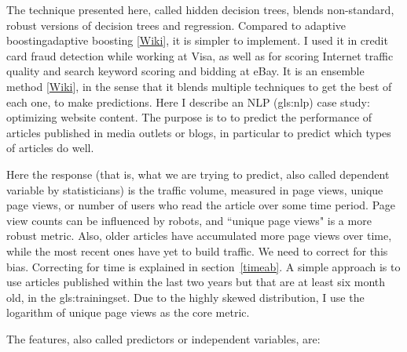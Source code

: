 \documentclass[oneside,10pt]{book}
\renewcommand{\arraystretch}{1.4} %
\begin{document}
The technique presented here, called \textcolor{index}{hidden decision trees}, blends non-standard, robust versions of 
 \textcolor{index}{decision trees} and regression. Compared to \textcolor{index}{adaptive boosting}\textcolor{index}{adaptive boosting} [\href{https://en.wikipedia.org/wiki/AdaBoost}{Wiki}], it is simpler to implement. I used it in credit card fraud detection while working at Visa, as well as for scoring Internet traffic quality and search keyword scoring and bidding at eBay. It is an \textcolor{index}{ensemble method} [\href{https://en.wikipedia.org/wiki/Ensemble_learning}{Wiki}], in the sense that it 
blends multiple techniques to get the best of each one, to make predictions.  Here I describe an NLP (\gls{gls:nlp}) case study: optimizing website content. 
The purpose is to to predict the performance of articles published in media outlets or blogs, in particular to predict which types of articles do well.


Here the response (that is, what we are trying to predict, also called dependent variable by statisticians) is the traffic volume, measured in page views, unique page views, or number of users who read the article over some time period. Page view counts
can be influenced by robots, and ``unique page views" is a more robust metric. Also, older articles have accumulated more page views over time, while the most recent ones
 have yet to build traffic. We need to correct for this bias. 
Correcting for time is explained in section~\ref{timeab}. A simple approach is to use articles published within the last two years but that are at least six month old, in the \gls{gls:trainingset}. Due to
 the highly skewed distribution, I use the logarithm of unique page views as the core metric. 

The features, also called predictors or independent variables, are:\vspace{1ex} 

\renewcommand{\arraystretch}{1.2} %
\end{document}
